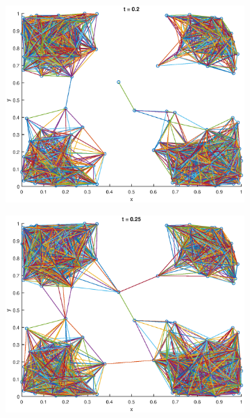 \documentclass[10pt]{article}
\begin{document}
\begin{figure}[H]
\begin{subfigure}[b]{.49\textwidth}
	   	\includegraphics[width=\columnwidth]{Ass1_20.eps}
	   	\caption{}
	   	\label{fig1e}
	\end{subfigure}
	\begin{subfigure}[b]{.49\textwidth}
		\includegraphics[width=\columnwidth]{Ass1_25.eps}
		\caption{}
		\label{fig1f}
	\end{subfigure}	
  \label{fig1.1}
\end{figure}

\section{}
\end{document}
